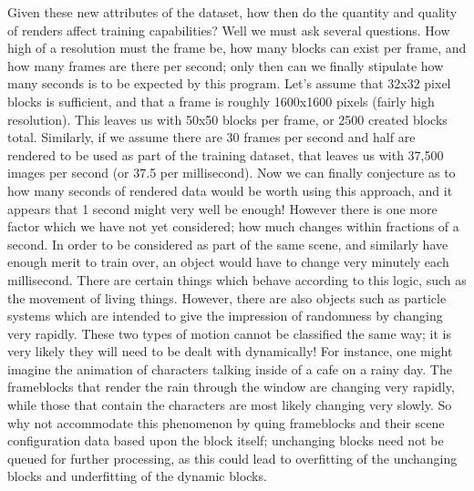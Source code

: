 \documentclass[conference]{IEEEtran}
\begin{document}
Given these new attributes of the dataset,
how then do the quantity and quality of renders affect training capabilities?
Well we must ask several questions.
How high of a resolution must the frame be, how many blocks can exist per frame,
and how many frames are there per second;
only then can we finally stipulate how many seconds is to be expected by this program.
Let's assume that 32x32 pixel blocks is sufficient, and that a frame is roughly 1600x1600 pixels (fairly high resolution).
This leaves us with 50x50 blocks per frame, or 2500 created blocks total.
Similarly, if we assume there are 30 frames per second and half are rendered to be used as part of the training dataset,
that leaves us with 37,500 images per second (or 37.5 per millisecond).
Now we can finally conjecture as to how many seconds of rendered data would be worth using this approach,
and it appears that 1 second might very well be enough!
However there is one more factor which we have not yet considered; how much changes within fractions of a second.
In order to be considered as part of the same scene, and similarly have enough merit to train over,
an object would have to change very minutely each millisecond.
There are certain things which behave according to this logic, such as the movement of living things.
However, there are also objects such as particle systems which are intended to give the impression of randomness by changing very rapidly.
These two types of motion cannot be classified the same way;
it is very likely they will need to be dealt with dynamically!
For instance, one might imagine the animation of characters talking inside of a cafe on a rainy day.
The frameblocks that render the rain through the window are changing very rapidly,
while those that contain the characters are most likely changing very slowly.
So why not accommodate this phenomenon by quing frameblocks and their scene configuration data based upon the block itself;
unchanging blocks need not be queued for further processing,
as this could lead to overfitting of the unchanging blocks and underfitting of the dynamic blocks.
\end{document}
